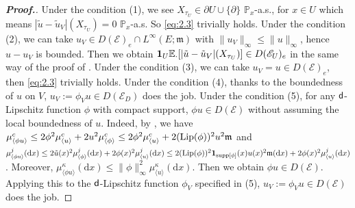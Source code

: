 \documentclass[12pt,a4paper]{article}
\renewcommand{\d}{\mathrm{d}}
\newcommand{\m}{\mathfrak{m} }
\newcommand{\1}{{\bf 1}}
\begin{document}
\begin{proof}[{\bf Proof.}]
Under the condition (1), we see $X_{\tau_U}\in\partial U\cup \{\partial\}$ $\mathbb{P}_x$-a.s., for $x\in U$ which means 
$|\tilde{u}-\tilde{u}_V|(X_{\tau_U})=0$ $\mathbb{P}_x$-a.s. 
So \eqref{eq:2.3} trivially holds.
Under the condition (2), we can take $u_V\in D(\mathscr{E})_e\cap L^{\infty}(E;{\m})$ with $\|u_V\|_{\infty}\leq\|u\|_{\infty}$, hence 
$u-u_V$ is bounded. Then we obtain $\1_U\mathbb{E}_{\cdot}[|\tilde{u}-\tilde{u}_V|(X_{\tau_U})]\in D(\mathscr{E}_U)_e$ in the same way of the proof of \cite[Lemma~2.3]{Chen}. Under the condition  (3), we can take $u_V=u\in D(\mathscr{E})_e$, then 
\eqref{eq:2.3} trivially holds. Under the condition (4), thanks to the boundedness of $u$ on $V$, $u_V:=\phi_Vu\in D(\mathscr{E}_D)$ does the job. Under the condition (5), for any ${\sf d}$-Lipschitz function $\phi$ with compact support, $\phi u\in D(\mathscr{E})$ without assuming the local boundedness of $u$. Indeed, 
by \cite[Theorem~4.9]{FLW}, we have 
$\mu^{c}_{\langle \phi u\rangle}\leq 2\phi^2\mu^{c}_{\langle  u\rangle}+2u^2\mu^{c}_{\langle \phi\rangle}\leq
2\phi^2\mu^{c}_{\langle  u\rangle}+2({\rm Lip}(\phi))^2u^2{\m}$ and   
$\mu^{j}_{\langle \phi u\rangle}({\d} x)\leq 2 \tilde{u}(x)^2
\mu^{j}_{\langle \phi\rangle}({\d} x)
+2\phi(x)^2\mu^{j}_{\langle u\rangle}({\d} x)\leq
2({\rm Lip}(\phi))^2\1_{{\rm supp}[\phi]}(x)u(x)^2{\m}({\d} x)+2\phi(x)^2\mu^{j}_{\langle u\rangle}({\d} x)$. Moreover, $\mu^{\kappa}_{\langle \phi u\rangle}({\d} x)\leq\|\phi\|_{\infty}^2 \mu^{\kappa}_{\langle u\rangle}({\d} x)$. Then we obtain $\phi u\in D(\mathscr{E})$. 
Applying this to the ${\sf d}$-Lipschitz function $\phi_V$ specified in 
(5), $u_V:=\phi_Vu\in  D(\mathscr{E})$ does the job. 
\end{proof}
\end{document}
